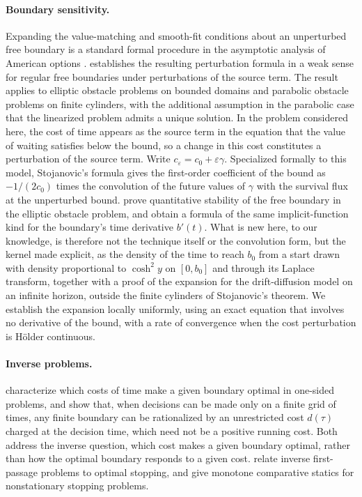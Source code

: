 \documentclass[11pt]{article}
\theoremstyle{definition}
\theoremstyle{remark}
\begin{document}
\paragraph{Boundary sensitivity.}
Expanding the value-matching and smooth-fit conditions about an unperturbed free boundary is a
standard formal procedure in the asymptotic analysis of American options
\citep{fouque2001,fouque2011}. \citet{stojanovic1997} establishes the resulting perturbation formula
in a weak sense for regular free boundaries under perturbations of the source term. The result
applies to elliptic obstacle problems on bounded domains and parabolic obstacle problems on finite
cylinders, with the additional assumption in the parabolic case that the linearized problem admits a
unique solution. In the problem considered here, the cost of time
appears as the source term in the equation that the value of waiting satisfies below the bound, so a
change in this cost constitutes a perturbation of the source term. Write
$c_\varepsilon = c_0 + \varepsilon\gamma$. Specialized formally to this model, Stojanovic's formula
gives the first-order coefficient of the bound as $-1/(2c_0)$ times the convolution of the future
values of $\gamma$ with the survival flux at the unperturbed bound. \citet{serfaty2018} prove quantitative stability of the free
boundary in the elliptic obstacle problem, and \citet{deangelis2024} obtain a formula of the same
implicit-function kind for the boundary's time derivative $b'(t)$. What is new here, to our
knowledge, is therefore not the technique itself or the convolution form, but the kernel made
explicit, as the density of the time to reach $b_0$ from a start drawn with density proportional to
$\cosh^2 y$ on $[0, b_0]$ and through its Laplace transform, together with a proof of the expansion
for the drift-diffusion model on an infinite horizon, outside the finite cylinders of Stojanovic's
theorem. We establish the expansion locally uniformly, using an exact equation
that involves no derivative of the bound, with a rate of convergence when the cost perturbation is
Hölder continuous.

\paragraph{Inverse problems.}
\citet{kruse2019} characterize which costs of time make a given boundary optimal in one-sided
problems, and \citet{fudenberg2018} show that, when decisions can be made only on a finite grid of
times, any finite boundary can be rationalized by an unrestricted cost $d(\tau)$ charged at the
decision time, which need not be a positive running cost. Both address the inverse question,
which cost makes a given boundary optimal, rather than how the optimal boundary responds to a
given cost.
\citet{ekstrom2016} relate inverse first-passage problems to optimal stopping, and
\citet{durandard2024} give monotone comparative statics for nonstationary stopping problems.
\end{document}

